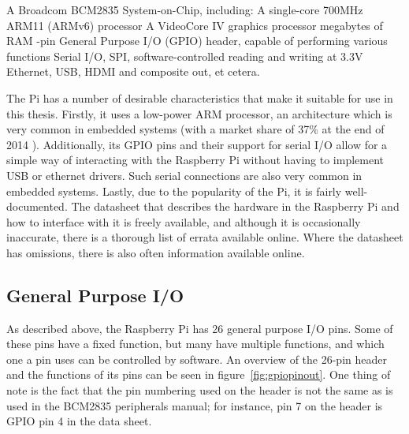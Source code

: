 \documentclass[twoside]{uva-inf-bachelor-thesis}
\begin{document}
\begin{outline}
    \1 A Broadcom BCM2835 System-on-Chip, including:
        \2 A single-core 700MHz ARM11 (ARMv6) processor
        \2 A VideoCore IV graphics processor
         megabytes of RAM
    -pin General Purpose I/O (GPIO) header, capable of performing various functions
        \2 Serial I/O, SPI, software-controlled reading and writing at 3.3V
    \1 Ethernet, USB, HDMI and composite out, et cetera.
\end{outline}

The Pi has a number of desirable characteristics that make it suitable for use in this thesis. Firstly, it uses a low-power ARM processor, an architecture which is very common in embedded systems (with a market share of 37\% at the end of 2014 \cite{arm:embeddedmarketshare}). Additionally, its GPIO pins and their support for serial I/O allow for a simple way of interacting with the Raspberry Pi without having to implement USB or ethernet drivers. Such serial connections are also very common in embedded systems. Lastly, due to the popularity of the Pi, it is fairly well-documented. The datasheet that describes the hardware in the Raspberry Pi and how to interface with it is freely available\cite{bcm:2835peripherals}, and although it is occasionally inaccurate, there is a thorough list of errata available online\cite{bcm:2835errata}. Where the datasheet has omissions, there is also often information available online.

\subsection{General Purpose I/O}
As described above, the Raspberry Pi has 26 general purpose I/O pins. Some of these pins have a fixed function, but many have multiple functions, and which one a pin uses can be controlled by software. An overview of the 26-pin header and the functions of its pins can be seen in figure~\ref{fig:gpiopinout}. One thing of note is the fact that the pin numbering used on the header is not the same as is used in the BCM2835 peripherals manual; for instance, pin 7 on the header is GPIO pin 4 in the data sheet.
\end{document}
